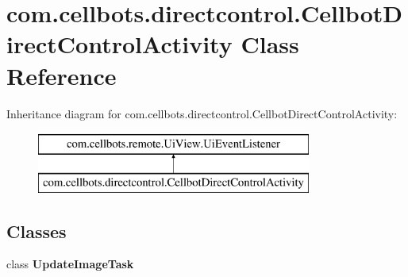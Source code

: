 \hypertarget{classcom_1_1cellbots_1_1directcontrol_1_1_cellbot_direct_control_activity}{\section{com.\-cellbots.\-directcontrol.\-Cellbot\-Direct\-Control\-Activity Class Reference}
\label{classcom_1_1cellbots_1_1directcontrol_1_1_cellbot_direct_control_activity}
}
Inheritance diagram for com.\-cellbots.\-directcontrol.\-Cellbot\-Direct\-Control\-Activity\-:\begin{figure}[H]
\begin{center}
\leavevmode
\includegraphics[height=2.000000cm]{classcom_1_1cellbots_1_1directcontrol_1_1_cellbot_direct_control_activity}
\end{center}
\end{figure}
\subsection*{Classes}
\begin{DoxyCompactItemize}
\item 
class {\bfseries Update\-Image\-Task}
\end{DoxyCompactItemize}
